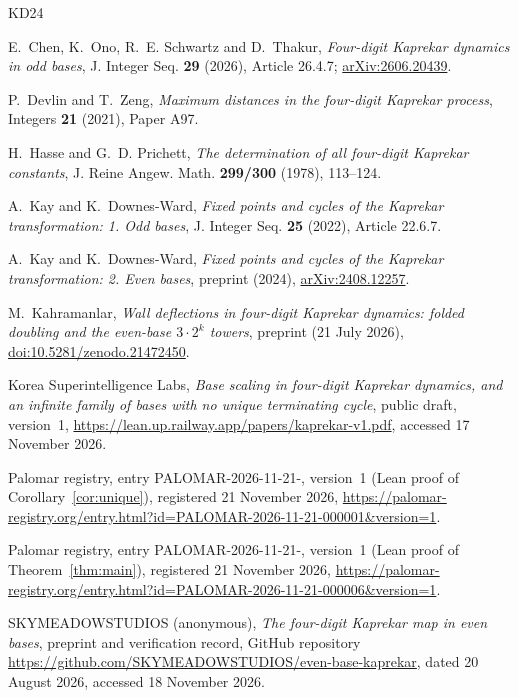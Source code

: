 \documentclass[11pt]{amsart}
\theoremstyle{definition}
\theoremstyle{remark}
\begin{document}
\begin{thebibliography}{KD24}

E.~Chen, K.~Ono, R.~E. Schwartz and D.~Thakur, \emph{Four-digit Kaprekar dynamics in odd bases}, J. Integer Seq. \textbf{29} (2026), Article 26.4.7; \href{https://arxiv.org/abs/2606.20439}{arXiv:2606.20439}.

P.~Devlin and T.~Zeng, \emph{Maximum distances in the four-digit Kaprekar process}, Integers \textbf{21} (2021), Paper A97.

H.~Hasse and G.~D. Prichett, \emph{The determination of all four-digit Kaprekar constants}, J. Reine Angew. Math. \textbf{299/300} (1978), 113--124.

A.~Kay and K.~Downes-Ward, \emph{Fixed points and cycles of the Kaprekar transformation: 1. Odd bases}, J. Integer Seq. \textbf{25} (2022), Article 22.6.7.

A.~Kay and K.~Downes-Ward, \emph{Fixed points and cycles of the Kaprekar transformation: 2. Even bases}, preprint (2024), \href{https://arxiv.org/abs/2408.12257}{arXiv:2408.12257}.

M.~Kahramanlar, \emph{Wall deflections in four-digit Kaprekar dynamics: folded doubling and the even-base $3\cdot2^k$ towers}, preprint (21 July 2026), \href{https://doi.org/10.5281/zenodo.21472450}{doi:10.5281/zenodo.21472450}.

Korea Superintelligence Labs, \emph{Base scaling in four-digit Kaprekar dynamics, and an infinite family of bases with no unique terminating cycle}, public draft, version~1, \url{https://lean.up.railway.app/papers/kaprekar-v1.pdf}, accessed 17 November 2026.

Palomar registry, entry PALOMAR-2026-11-21-, version~1 (Lean proof of Corollary~\ref{cor:unique}), registered 21 November 2026, \url{https://palomar-registry.org/entry.html?id=PALOMAR-2026-11-21-000001&version=1}.

Palomar registry, entry PALOMAR-2026-11-21-, version~1 (Lean proof of Theorem~\ref{thm:main}), registered 21 November 2026, \url{https://palomar-registry.org/entry.html?id=PALOMAR-2026-11-21-000006&version=1}.

SKYMEADOWSTUDIOS (anonymous), \emph{The four-digit Kaprekar map in even bases}, preprint and verification record, GitHub repository \url{https://github.com/SKYMEADOWSTUDIOS/even-base-kaprekar}, dated 20 August 2026, accessed 18 November 2026.

\end{thebibliography}
\end{document}
